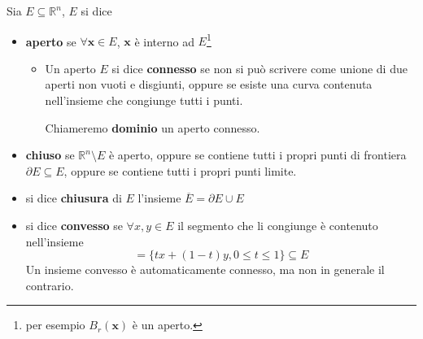 \documentclass[10pt,a4paper,twoside,openright]{book}
\newcommand{\x}{\mathbf{x}}
\begin{document}
Sia $E\subseteq \mathbb{R}^{n}$, $E$ si dice
\begin{itemize}
    \item \textbf{aperto} se $\forall \x\in E$, $\x$ è interno ad $E$\footnote{per esempio $B_{r}(\x)$ è un aperto.}
          \begin{itemize}
              \item Un aperto $E$ si dice \textbf{connesso} se non si può scrivere come unione di due aperti non vuoti e disgiunti, oppure se esiste una curva contenuta nell'insieme che congiunge tutti i punti.

                    Chiameremo \textbf{dominio} un aperto connesso.
          \end{itemize}
    \item \textbf{chiuso} se $\mathbb{R}^{n} \setminus E$ è aperto, oppure se contiene tutti i propri punti di frontiera $\partial E\subseteq E$, oppure se contiene tutti i propri punti limite.
    \item si dice \textbf{chiusura} di $E$ l'insieme $\displaystyle \overline{E} =\partial E\cup E$
    \item si dice \textbf{convesso} se $\forall x,y\in E$ il segmento che li congiunge è contenuto nell'insieme
          \begin{equation*}
              [ x,y] =\{tx+(1-t) y,0\leqslant t\leqslant 1\} \subseteq E
          \end{equation*}Un insieme convesso è automaticamente connesso, ma non in generale il contrario.
          \begin{figure}[htpb]
              \centering



              \begin{tikzpicture}[x=0.75pt,y=0.75pt,yscale=-1,xscale=1]


\end{tikzpicture}
\end{figure}
\end{itemize}
\end{document}
